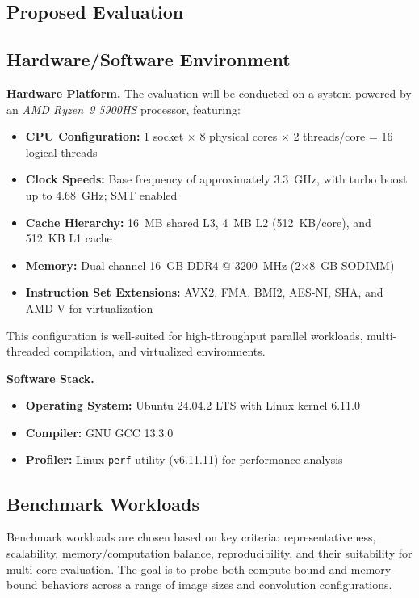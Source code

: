 \documentclass[conference, 10pt]{IEEEtran}
\begin{document}
\begin{itemize}
\begin{itemize}
\section{Proposed Evaluation}

\subsection{\textbf{Hardware/Software Environment}}

\textbf{Hardware Platform.} The evaluation will be conducted on a system powered by an \textit{AMD Ryzen\texttrademark~9 5900HS} processor, featuring:
\begin{itemize}
    \item \textbf{CPU Configuration:} 1 socket $\times$ 8 physical cores $\times$ 2 threads/core = 16 logical threads
    \item \textbf{Clock Speeds:} Base frequency of approximately 3.3~GHz, with turbo boost up to 4.68~GHz; SMT enabled
    \item \textbf{Cache Hierarchy:} 16~MB shared L3, 4~MB L2 (512~KB/core), and 512~KB L1 cache
    \item \textbf{Memory:} Dual-channel 16~GB DDR4 @ 3200~MHz (2$\times$8~GB SODIMM)
    \item \textbf{Instruction Set Extensions:} AVX2, FMA, BMI2, AES-NI, SHA, and AMD-V for virtualization
\end{itemize}
This configuration is well-suited for high-throughput parallel workloads, multi-threaded compilation, and virtualized environments.

\textbf{Software Stack.}
\begin{itemize}
    \item \textbf{Operating System:} Ubuntu 24.04.2 LTS with Linux kernel 6.11.0
    \item \textbf{Compiler:} GNU GCC 13.3.0
    \item \textbf{Profiler:} Linux \texttt{perf} utility (v6.11.11) for performance analysis
\end{itemize}



\subsection{\textbf{Benchmark Workloads}}

Benchmark workloads are chosen based on key criteria: representativeness, scalability, memory/computation balance, reproducibility, and their suitability for multi-core evaluation. The goal is to probe both compute-bound and memory-bound behaviors across a range of image sizes and convolution configurations.


\end{itemize}
\end{itemize}
\end{document}
